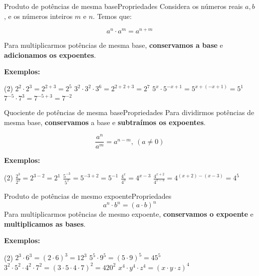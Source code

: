 \documentclass[aspectratio=169,11pt]{if-beamer}
\begin{document}
    \begin{frame}{Produto de potências de mesma base}{Propriedades}
        Considera os números reais \(a,b\), e os números inteiros \(m\) e \(n\). Temos que:
        
        \[a^n \cdot a^m = a^{n + m}\]
        
        Para multiplicarmos potências de mesma base, \textbf{conservamos a base} e \textbf{adicionamos os expoentes}.
        \vspace{.5cm}
        
        \textbf{Exemplos:}
        
        \begin{tasks}(2)
            \task \(2^2 \cdot 2^3 = 2^{2+3} = 2^5\)
            \task \(3^2 \cdot 3^2 \cdot 3^6 = 2^{2+2+3} = 2^7\)
            \task \(5^x \cdot 5^{-x+1} = 5^{x + (-x+1)} = 5^1\)
            \task \(7^{-5} \cdot 7^{3} = 7^{-5+3} = 7^{-2}\)
        \end{tasks}
        
    \end{frame}
    
    \begin{frame}{Quociente de potências de mesma base}{Propriedades}
        Para dividirmos potências de mesma base, \textbf{conservamos} a base e \textbf{subtraímos os expoentes}.
        
        \[\frac{a^n}{a^m} = a^{n-m}, ~(a \neq 0)\]
        
        \vspace{1cm}
        \textbf{Exemplos:}
        
        \begin{tasks}(2)
            \task \(\frac{2^3}{2^2} = 2^{3-2} = 2^1\)
            \task \(\frac{5^{-3}}{5^{2}} = 5^{-3+2} = 5^{-1}\)
            \task \(\frac{4^x}{4^3} = 4^{x-3}\)
            \task \(\frac{4^{x+2}}{4^{x-3}} = 4^{(x+2)-(x-3)} = 4^{5}\)
        \end{tasks}
    \end{frame}
    
    \begin{frame}{Produto de potências de mesmo expoente}{Propriedades}
        \[a^n \cdot b^n = (a \cdot b)^n\]
        Para multiplicarmos potências de mesmo expoente, \textbf{conservamos o expoente} e \textbf{multiplicamos as bases}.
        
        \vspace{1cm}
        \textbf{Exemplos:}
        
        \begin{tasks}(2)
            \task \(2^3 \cdot 6^3 = (2 \cdot 6)^3 = 12^3\)
            \task \(5^5 \cdot 9^5 = (5 \cdot 9)^5 = 45^5\)
            \task \(3^2 \cdot 5^2 \cdot 4^2 \cdot 7^2= (3 \cdot 5 \cdot 4 \cdot 7)^2 = 420^2\)
            \task \(x^4 \cdot y^4 \cdot z^4 = (x \cdot y \cdot z)^4\)
        \end{tasks}
    \end{frame}
    
\end{document}
